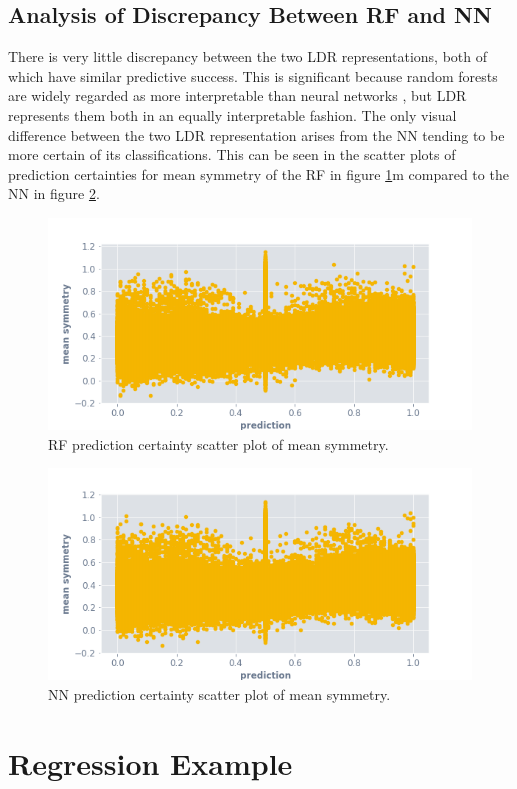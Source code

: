 \documentclass[a4paper, twocolumn]{article}
\begin{document}
\subsection{Analysis of Discrepancy Between RF and NN}

There is very little discrepancy between the two LDR representations, both of which have similar predictive success. This is significant because random forests are widely regarded as more interpretable than neural networks \cite{song2013random}, but LDR represents them both in an equally interpretable fashion. The only visual difference between the two LDR representation arises from the NN tending to be more certain of its classifications. This can be seen in the scatter plots of prediction certainties for mean symmetry of the RF in figure \ref{fig:rf-if-mean-symmetry-scatter}m compared to the NN in figure \ref{fig:nn-if-mean-symmetry-scatter}.

\begin{figure}
\centering
\includegraphics[width=0.7\columnwidth]{img/rf_if_mean_symmetry.png}
\caption{RF prediction certainty scatter plot of mean symmetry.}
\label{fig:rf-if-mean-symmetry-scatter}
\end{figure}

\begin{figure}
\centering
\includegraphics[width=0.7\columnwidth]{img/nn_if_mean_symmetry.png}
\caption{NN prediction certainty scatter plot of mean symmetry.}
\label{fig:nn-if-mean-symmetry-scatter}
\end{figure}

\section{Regression Example}
\end{document}
